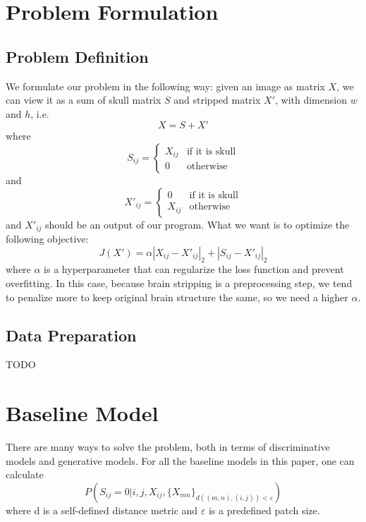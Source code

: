 \documentclass[conference]{IEEEtran}
\begin{document}
\section{Problem Formulation}
\subsection*{Problem Definition}
We formulate our problem in the following way: given an image as matrix $X$, we can view it as a sum of skull matrix $S$ and stripped matrix $X'$, with dimension $w$ and $h$, i.e.
\[
X = S + X'
\]
where
\[
S_{ij} = 
\begin{cases}
X_{ij} &\text{if it is skull} \\
0 &\text{otherwise}
\end{cases}
\]
and 
\[
X'_{ij} = 
\begin{cases}
0 &\text{if it is skull} \\
X_{ij} &\text{otherwise}
\end{cases}
\]
and $X'_{ij}$ should be an output of our program. What we want is to optimize the following objective: 
\begin{equation}
\label{loss}
J(X') = \alpha{|X_{ij} -X'_{ij}|_2} + |S_{ij} - X'_{ij}|_2
\end{equation}
where $\alpha$ is a hyperparameter that can regularize the loss function and prevent overfitting. In this case, because brain stripping is a preprocessing step, we tend to penalize more to keep original brain structure the same, so we need a higher $\alpha$. 

\subsection*{Data Preparation}
TODO

\section{Baseline Model}
There are many ways to solve the problem, both in terms of discriminative models and generative models. For all the baseline models in this paper, one can calculate 
\begin{equation}
\label{prob}
P(S_{ij} = 0 | i, j, X_{ij}, \{X_{mn}\}_{d((m,n), (i, j)) < \varepsilon})
\end{equation}
where d is a self-defined distance metric and $\varepsilon$ is a predefined patch size. 
\end{document}

